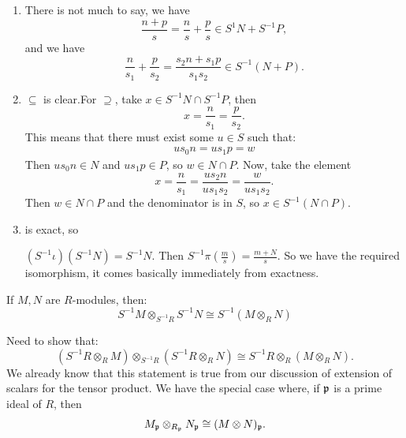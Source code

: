 \documentclass{article}
\begin{document}
\begin{enumerate}
    \item There is not much to say, we have \[ \frac{n+p}{s} = \frac{n}{s} + \frac{p}{s} \in S^{1}N + S^{-1}P,\] and we have \[ \frac{n}{s_{1}} + \frac{p}{s_{2}} = \frac{s_{2}n + s_{1}p}{s_{1}s_{2}} \in S^{-1}(N+P). \]
    \item $\subseteq$ is clear.\gap For $\supseteq$, take $x \in S^{-1}N \cap S^{-1}P$, then \[ x= \frac{n}{s_{1}}=\frac{p}{s_{2}}.\] This means that there must exist some $u \in S$ such that:
    \begin{align*}
        us_{0}n=us_{1}p=w
    \end{align*}
    Then $us_{0}n \in N$ and $us_{1}p \in P$, so $w \in N \cap P$. Now, take the element \[ x=\frac{n}{s_{1}} = \frac{us_{2}n}{us_{1}s_{2}} = \frac{w}{us_{1}s_{2}}.\] Then $w \in N \cap P$ and the denominator is in $S$, so $x \in S^{-1}(N \cap P)$.
    \item \begin{center}
    \end{center}
    is exact, so \begin{center}
    \end{center}
    $(S^{-1}\iota)(S^{-1}N) = S^{-1}N$. Then $S^{-1}\pi\left(\frac{m}{s}\right) = \frac{m+N}{s}$. So we have the required isomorphism, it comes basically immediately from exactness.
\end{enumerate}
\begin{fancyprop}
    If $M,N$ are $R$-modules, then: \[ S^{-1}M \otimes_{S^{-1}R} S^{-1}N \cong S^{-1}(M \otimes_{R} N)\]
\end{fancyprop}
\proof Need to show that: \[(S^{-1}R \otimes_{R} M) \otimes_{S^{-1}R} (S^{-1}R \otimes_{R} N) \cong S^{-1}R \otimes_{R} (M \otimes_{R} N).\]
We already know that this statement is true from our discussion of extension of scalars for the tensor product. \endproof 
We have the special case where, if $\mathfrak{p}$ is a prime ideal of $R$, then \[ M_{\mathfrak{p}} \otimes_{R_{\mathfrak{p}}} N_{\mathfrak{p}} \cong (M \otimes N)_{\mathfrak{p}}.\]
\end{document}
